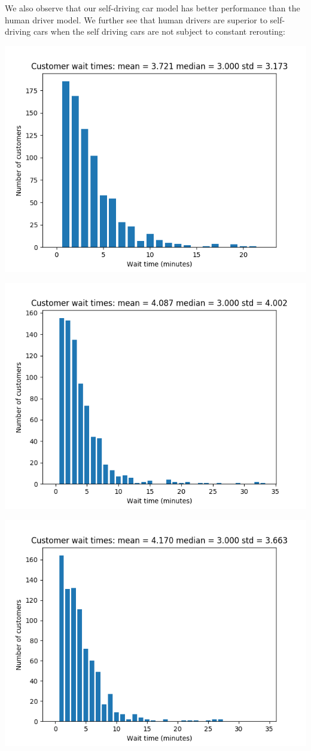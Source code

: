 \documentclass[Proceedings]{ascelike}
\begin{document}
We also observe that our self-driving car model has better performance than the human driver model. We further see
that human drivers are superior to self-driving cars when the self driving cars are not subject to constant
rerouting:

\includegraphics[width=0.75 \textwidth]{self_customers}

\includegraphics[width=0.75 \textwidth]{human_customers}

\includegraphics[width=0.75 \textwidth]{no_reroute_customers}
\end{document}
